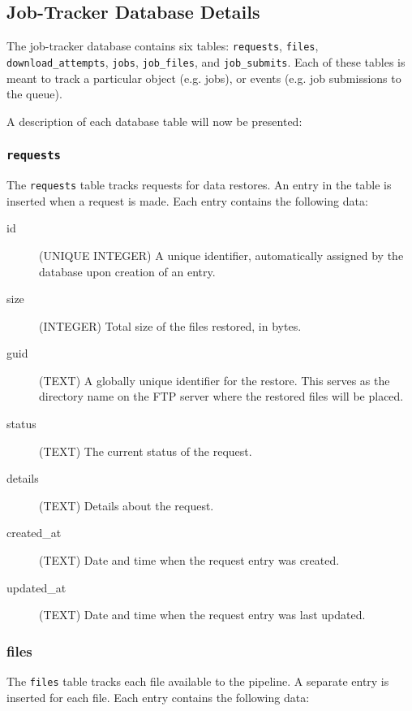\subsection{Job-Tracker Database Details}
\label{sec:dbdetails}

The job-tracker database contains six tables: \texttt{requests}, \texttt{files}, \texttt{download\_attempts}, \texttt{jobs}, \texttt{job\_files}, and \texttt{job\_submits}. Each of these tables is meant to track a particular object (e.g. jobs), or events (e.g. job submissions to the queue).

A description of each database table will now be presented:

\subsubsection{\texttt{requests}}
The \texttt{requests} table tracks requests for data restores. An entry in the table is inserted when a request is made. Each entry contains the following data:
\begin{description}
    \item[id] (UNIQUE INTEGER) A unique identifier, automatically assigned by the database upon creation of an entry.
    \item[size] (INTEGER) Total size of the files restored, in bytes.
    \item[guid] (TEXT) A globally unique identifier for the restore. This serves as the directory name on the FTP server where the restored files will be placed.
    \item[status] (TEXT) The current status of the request.
    \item[details] (TEXT) Details about the request.
    \item[created\_at] (TEXT) Date and time when the request entry was created.
    \item[updated\_at] (TEXT) Date and time when the request entry was last updated.
\end{description}

\subsubsection{files}
The \texttt{files} table tracks each file available to the pipeline. A separate entry is inserted for each file. Each entry contains the following data:

